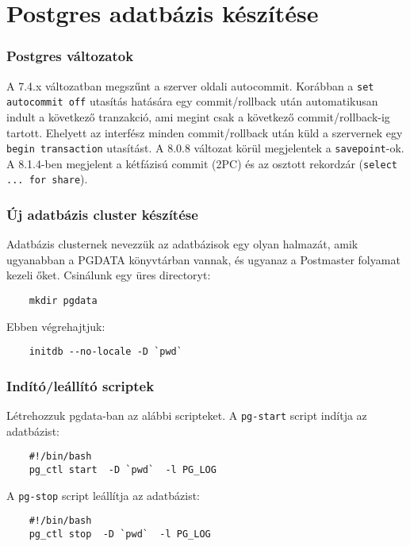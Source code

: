 
\section{Postgres adatbázis készítése}


\subsubsection*{Postgres változatok}

A 7.4.x változatban megszűnt a szerver oldali autocommit. 
Korábban a \verb!set autocommit off! utasítás hatására egy 
commit/rollback után automatikusan indult a következő tranzakció,
ami megint csak a következő commit/rollback-ig tartott. 
Ehelyett az interfész minden commit/rollback után
küld a szervernek egy \verb!begin transaction! utasítást.
A 8.0.8 változat körül megjelentek a \verb!savepoint!-ok.
A 8.1.4-ben megjelent a kétfázisú commit (2PC) és az osztott
rekordzár (\verb!select ... for share!).

\subsubsection*{Új adatbázis cluster készítése}

Adatbázis clusternek nevezzük az adatbázisok egy olyan
halmazát, amik ugyanabban a PGDATA könyvtárban vannak, 
és ugyanaz a Postmaster folyamat kezeli őket.
Csinálunk egy üres directoryt:
\begin{verbatim}
    mkdir pgdata
\end{verbatim}


Ebben végrehajtjuk:
\begin{verbatim}
    initdb --no-locale -D `pwd` 
\end{verbatim}

\subsubsection*{Indító/leállító scriptek}

Létrehozzuk pgdata-ban az alábbi scripteket. 
A \verb!pg-start! script indítja az adatbázist:
\begin{verbatim}
    #!/bin/bash
    pg_ctl start  -D `pwd`  -l PG_LOG
\end{verbatim}

A \verb!pg-stop! script leállítja az adatbázist:
\begin{verbatim}
    #!/bin/bash
    pg_ctl stop  -D `pwd`  -l PG_LOG
\end{verbatim}


